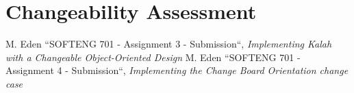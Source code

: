 \documentclass[10pt, a4paper, conference]{IEEEtran}
\begin{document}
\section{Changeability Assessment}

\begin{thebibliography}{00}
   M. Eden ``SOFTENG 701 - Assignment 3 - Submission``,
    \textit{Implementing Kalah with a Changeable Object-Oriented Design}
   M. Eden ``SOFTENG 701 - Assignment 4 - Submission``,
    \textit{Implementing the Change Board Orientation change case}
\end{thebibliography}
\end{document}
